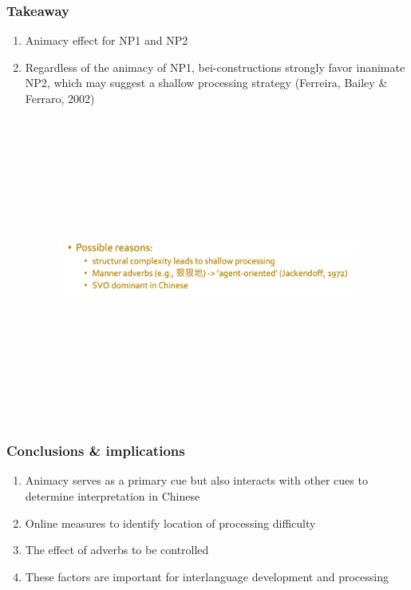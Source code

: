 \documentclass{beamer}
\begin{document}
\begin{frame}
\frametitle{Takeaway}
\begin{enumerate}
   \item Animacy effect for NP1 and NP2
   \setlength{\parskip}{1em}
   \item Regardless of the animacy of NP1, bei-constructions strongly favor inanimate NP2, which may suggest a shallow processing strategy (Ferreira, Bailey & Ferraro, 2002) \Rightarrow {} 
   
\begin{figure}
\pause
\includegraphics[width=10cm,height=10cm,keepaspectratio]{SHF_Presentation/PossibleReason.png}
\pause
\end{figure} 

\end{enumerate}
\end{frame}



\begin{frame}
\frametitle{Conclusions \& implications}

\begin{enumerate}
    \pause
   \item Animacy serves as a primary cue but also interacts with other cues to determine interpretation in Chinese
   \pause
   \setlength{\parskip}{1em}
   \pause
   \item Online measures to identify location of processing difficulty 
   \pause
   \item The effect of adverbs to be controlled
   \pause
   \item These factors are important for interlanguage development and processing 
\end{enumerate}
\end{frame}
\end{document}
